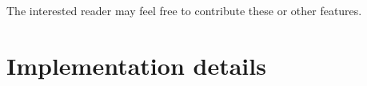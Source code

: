 \documentclass[10pt]{report}
\begin{document}
The interested reader may feel free to contribute these or other features.

\appendix

\chapter{Implementation details}

\newcommand{\red}{\textcolor{red}}
\newcommand{\blue}{\textcolor{blue}}

\newcommand{\dif}{\mathrm{d}}

\newcommand{\myu}[1]{\underaccent{\bar}{#1}}

\newcommand{\onehalf}{\tfrac{1}{2}}

\newcommand{\mat}[1]{\mbox{$\mathsfsl{#1}$}}
\newcommand{\myvec}[1]{\mbox{\boldmath$#1$}}

\newcommand{\diagv}[1]{\mathrm{diag_v}(#1)}
\newcommand{\diagm}[1]{\mathrm{diag_m}(#1)}
\newcommand{\trace}[1]{\mathrm{tr}(#1)}
\newcommand{\transv}[1]{\myvec{#1}^\top}
\newcommand{\transm}[1]{\mat{#1}^\top}

\newcommand{\imat}[1]{\mat{#1^{-1}}}
\newcommand{\itransm}[1]{\mat{#1^{-\top}}}
\newcommand{\chol}[1]{\mat{#1^{\onehalf}}}
\newcommand{\cholt}[1]{\mat{#1^{\tfrac{\top}{2}}}}
\newcommand{\ichol}[1]{\mat{#1^{-\onehalf}}}
\newcommand{\icholt}[1]{\mat{#1^{-\tfrac{\top}{2}}}}

\newcommand{\Km}{\mat{K_M}}
\newcommand{\iKm}{\imat{K_M}}
\newcommand{\dKm}{\mat{\dot{K}_M}}
\newcommand{\dKn}{\mat{\dot{K}_N}}
\newcommand{\Knm}{\mat{K_{NM}}}
\newcommand{\Kmn}{\transm{K_{NM}}}
\newcommand{\uKnm}{\myu{\mat{K}}_{\mathsfsl{NM}}}
\newcommand{\uuKnm}{\myu{\myu{\mat{K}}}_{\mathsfsl{NM}}}
\newcommand{\dKnm}{\mat{\dot{K}_{NM}}}
\newcommand{\uKmn}{\myu{\mat{K}}_{\mathsfsl{NM}}^\top}

\newcommand{\dl}{\dot{l}}

\newcommand{\vecu}{\myvec{u}}
\newcommand{\vecr}{\myvec{r}}
\newcommand{\vecs}{\myvec{s}}
\newcommand{\vect}{\myvec{t}}
\newcommand{\vecw}{\myvec{w}}
\newcommand{\vecv}{\myvec{v}}
\newcommand{\vecvx}{\myvec{v}_1}
\newcommand{\vecvy}{\myvec{v}_2}
\newcommand{\vecy}{\myvec{y}}
\newcommand{\uvecy}{\myu{\vecy}}

\newcommand{\vecsdh}{\onehalf\myvec{\dot{s}}}
\newcommand{\vecis}{\myvec{s}^{-1}}
\newcommand{\veciss}{\myvec{s}^{-\onehalf}}

\newcommand{\matB}{\mat{B}}
\newcommand{\matI}{\mat{I}}
\newcommand{\matQ}{\mat{Q}}
\newcommand{\matQn}{\mat{\widetilde{Q}}}
\newcommand{\tmatQn}{\transm{\widetilde{Q}}}
\newcommand{\matR}{\mat{R}}
\newcommand{\matS}{\mat{S}}
\newcommand{\matT}{\mat{T}}
\newcommand{\matU}{\mat{U}}
\newcommand{\matUx}{\mat{U}_1}
\newcommand{\matUy}{\mat{U}_2}
\newcommand{\matV}{\mat{V}}
\newcommand{\matW}{\mat{W}}
\newcommand{\matWx}{\mat{W}_1}
\newcommand{\matX}{\mat{X}}
\newcommand{\matXx}{\mat{X}_1}
\newcommand{\matWy}{\mat{W}_2}
\newcommand{\matXy}{\mat{X}_2}
\end{document}
